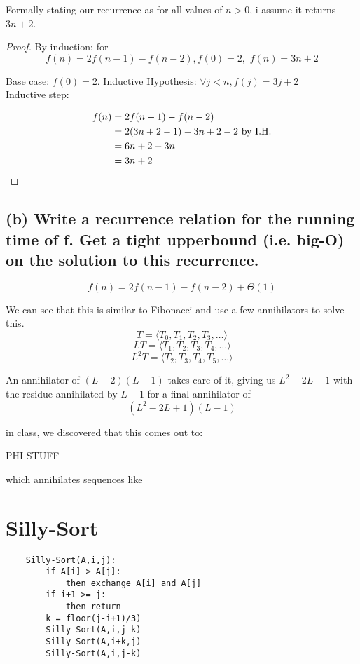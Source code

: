 \documentclass[titlepage]{article}\usepackage[]{graphicx}\usepackage[]{color}
\begin{document}
Formally stating our recurrence as 
for all values of $n > 0$,  i assume it returns $3n+2$. 
\begin{proof} By induction: for 
\[ f(n) = 2f(n-1) - f(n-2) , f(0) = 2,\,\, f(n) = 3n +2 \]

Base case: $f(0) = 2$.  
Inductive Hypothesis: $\forall j < n, f(j) = 3j + 2 $ \\
Inductive step: 

\begin{align*}
	f(n) &= 2f(n-1) - f(n-2) \\
	&= 2(3n + 2 -1) - 3n+2-2 \text{ by I.H.} \\
	&= 6n + 2 - 3n \\
	&= 3n + 2 \qedhere
\end{align*}
\end{proof}


\subsection{(b) Write a recurrence relation for the running time of f. Get a tight
upperbound (i.e. big-O) on the solution to this recurrence.}

\[ f(n) = 2f(n-1) - f(n-2) + \Theta(1) \]

We can see that this is similar to Fibonacci and use a few annihilators to
solve this.
\[ T = \langle T_0, T_1, T_2, T_3, \ldots \rangle \]
\[ LT = \langle T_1, T_2, T_3, T_4, \ldots \rangle \]
\[ L^2T = \langle T_2, T_3, T_4, T_5, \ldots \rangle \]



An annihilator of $(L - 2)(L-1)$ takes care of it, giving us  
$ L^2 - 2L + 1 $ with the residue annihilated by $L-1$ for a final annihilator
of
\[ (L^2 - 2L + 1)(L-1) \]

in class, we discovered that this comes out to: 

PHI STUFF

which annihilates sequences like 




\section{Silly-Sort }
\begin{lstlisting}
	Silly-Sort(A,i,j):
		if A[i] > A[j]:
			then exchange A[i] and A[j]
		if i+1 >= j:
			then return
		k = floor(j-i+1)/3)
		Silly-Sort(A,i,j-k)
		Silly-Sort(A,i+k,j)
		Silly-Sort(A,i,j-k)
	
\end{lstlisting}
\end{document}
